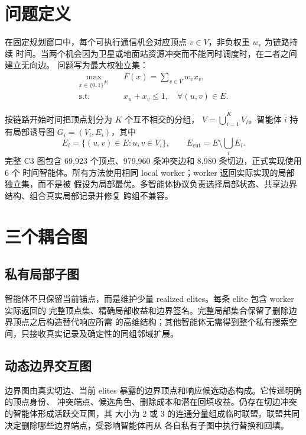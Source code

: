 \section{问题定义}

在固定规划窗口中，每个可执行通信机会对应顶点 $v\in V$，非负权重 $w_v$ 为链路持续
时间。当两个机会因为卫星或地面站资源冲突而不能同时调度时，在二者之间建立无向边。
问题写为最大权独立集：
\begin{equation}
\begin{aligned}
\max_{x\in\{0,1\}^{|V|}}\quad &F(x)=\sum_{v\in V}w_vx_v,\\
\text{s.t.}\quad &x_u+x_v\leq 1,\quad \forall (u,v)\in E.
\end{aligned}
\label{eq:mwis}
\end{equation}

按链路开始时间把顶点划分为 $K$ 个互不相交的分组，
$V=\dot\bigcup_{i=1}^{K}V_i$。智能体 $i$ 持有局部诱导图
$G_i=(V_i,E_i)$，其中
\begin{equation}
E_i=\{(u,v)\in E:u,v\in V_i\},\qquad
E_{\mathrm{cut}}=E\setminus\bigcup_iE_i.
\end{equation}
完整 C3 图包含 69,923 个顶点、979,960 条冲突边和 8,980 条切边，正式实现使用 6 个
时间智能体。所有方法使用相同 local worker；worker 返回实际实现的局部独立集，而不是被
假设为局部最优。多智能体协议负责选择局部状态、共享边界结构、组合真实局部记录并修复
跨组不兼容。

\section{三个耦合图}

\subsection{私有局部子图}

智能体不只保留当前锚点，而是维护少量 realized elites。每条 elite 包含 worker 实际返回的
完整顶点集、精确局部收益和边界签名。完整局部集合保留了删除边界顶点之后构造替代响应所需
的高维结构；其他智能体无需得到整个私有搜索空间，只接收真实记录及确定性的同组邻域扩展。

\subsection{动态边界交互图}

边界图由真实切边、当前 elites 暴露的边界顶点和响应候选动态构成。它传递明确的顶点身份、
冲突端点、候选角色、删除成本和潜在回填收益。仍存在切边冲突的智能体形成活跃交互图，其
大小为 2 或 3 的连通分量组成临时联盟。联盟共同决定删除哪些边界端点，受影响智能体再从
各自私有子图中执行替换和回填。

